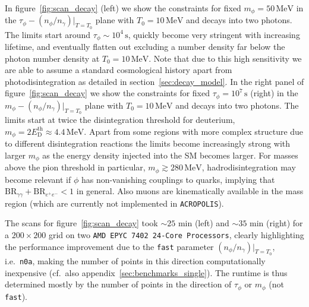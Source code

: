 \documentclass[11pt,a4paper]{article}
\begin{document}
In figure~\ref{fig:scan_decay} (left) we show the constraints for fixed $m_\phi = 50 \, \mathrm{MeV}$ in the $\tau_\phi - (n_\phi/n_\gamma)|_{T=T_0}$ plane with $T_0 = 10 \, \mathrm{MeV}$ and decays into two photons. The limits start around $\tau_\phi \sim 10^4 \, \mathrm{s}$, quickly become very stringent with increasing lifetime, and eventually flatten out excluding a number density far below the photon number density at $T_0 = 10 \, \mathrm{MeV}$. Note that due to this high sensitivity we are able to assume a standard cosmological history apart from photodisintegration as detailed in section~\ref{sec:decay_model}.
In the right panel of figure~\ref{fig:scan_decay} we show the constraints for fixed $\tau_\phi = 10^7 \, \mathrm{s}$ (right) in the $m_\phi - (n_\phi/n_\gamma)|_{T=T_0}$ plane with $T_0 = 10 \, \mathrm{MeV}$ and decays into two photons. The limits start at twice the disintegration threshold for deuterium, $m_\phi = 2 E_\mathrm{D}^\mathrm{th} \approx 4.4 \, \mathrm{MeV}$. Apart from some regions with more complex structure due to different disintegration reactions the limits become increasingly strong with larger $m_\phi$ as the energy density injected into the SM becomes larger. For masses above the pion threshold in particular, $m_\phi \gtrsim 280 \, \mathrm{MeV}$, hadrodisintegration may become relevant if $\phi$ has non-vanishing couplings to quarks, implying that $\text{BR}_{\gamma \gamma} + \text{BR}_{e^+ e^-} < 1$ in general. Also muons are kinematically available in the mass region (which are currently not implemented in \texttt{ACROPOLIS}).

The scans for figure~\ref{fig:scan_decay} took $\sim 25$ min (left) and $\sim 35$ min (right) for a $200 \times 200$ grid on two \texttt{AMD EPYC 7402 24-Core Processors}, clearly highlighting the performance improvement due to the \texttt{fast} parameter $(n_\phi/n_\gamma)|_{T=T_0}$, i.e.\ \texttt{n0a}, making the number of points in this direction computationally inexpensive (cf.\ also appendix~\ref{sec:benchmarks_single}). The runtime is thus determined mostly by the number of points in the direction of $\tau_\phi$ or $m_\phi$ (not \texttt{fast}).
\end{document}
